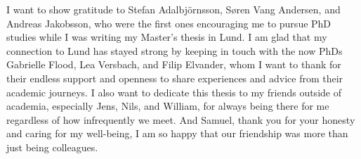 \noindent 
I want to show gratitude to Stefan Adalbjörnsson, S{\o}ren Vang Andersen, and Andreas Jakobsson, who were the first ones encouraging me to pursue PhD studies while I was writing my Master's thesis in Lund. %
I am glad that my connection to Lund has stayed strong by keeping in touch with the now PhDs Gabrielle Flood, Lea Versbach, and Filip Elvander, whom I want to thank for their endless support and openness to share experiences and advice from their academic journeys. 
I also want to dedicate this thesis to my friends outside of academia,
especially Jens, Nils, and William, for always being there for me regardless of how infrequently we meet. 
And Samuel, thank you for your honesty and caring for my well-being, I am so happy that our friendship was more than just being colleagues. 
\newline 





